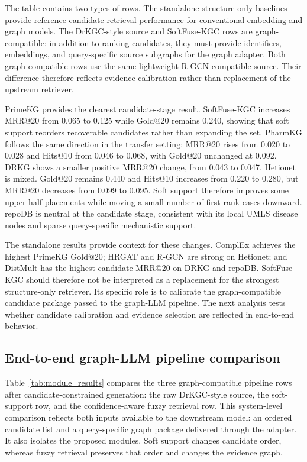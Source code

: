 \documentclass[pdflatex,sn-mathphys-num]{sn-jnl}
\newcommand{\tabref}[1]{Table~\ref{#1}}
\newcommand{\softfuse}{SoftFuse-KGC}
\newcommand{\drkgc}{DrKGC}
\begin{document}
The table contains two types of rows. The standalone structure-only baselines provide reference candidate-retrieval performance for conventional embedding and graph models. The \drkgc{}-style source and \softfuse{} rows are graph-compatible: in addition to ranking candidates, they must provide identifiers, embeddings, and query-specific source subgraphs for the graph adapter. Both graph-compatible rows use the same lightweight R-GCN-compatible source. Their difference therefore reflects evidence calibration rather than replacement of the upstream retriever.

PrimeKG provides the clearest candidate-stage result. \softfuse{} increases MRR@20 from 0.065 to 0.125 while Gold@20 remains 0.240, showing that soft support reorders recoverable candidates rather than expanding the set. PharmKG follows the same direction in the transfer setting: MRR@20 rises from 0.020 to 0.028 and Hits@10 from 0.046 to 0.068, with Gold@20 unchanged at 0.092. DRKG shows a smaller positive MRR@20 change, from 0.043 to 0.047. Hetionet is mixed. Gold@20 remains 0.440 and Hits@10 increases from 0.220 to 0.280, but MRR@20 decreases from 0.099 to 0.095. Soft support therefore improves some upper-half placements while moving a small number of first-rank cases downward. repoDB is neutral at the candidate stage, consistent with its local UMLS disease nodes and sparse query-specific mechanistic support.

The standalone results provide context for these changes. ComplEx achieves the highest PrimeKG Gold@20; HRGAT and R-GCN are strong on Hetionet; and DistMult has the highest candidate MRR@20 on DRKG and repoDB. \softfuse{} should therefore not be interpreted as a replacement for the strongest structure-only retriever. Its specific role is to calibrate the graph-compatible candidate package passed to the graph-LLM pipeline. The next analysis tests whether candidate calibration and evidence selection are reflected in end-to-end behavior.

\subsection{End-to-end graph-LLM pipeline comparison}

\tabref{tab:module_results} compares the three graph-compatible pipeline rows after candidate-constrained generation: the raw \drkgc{}-style source, the soft-support row, and the confidence-aware fuzzy retrieval row. This system-level comparison reflects both inputs available to the downstream model: an ordered candidate list and a query-specific graph package delivered through the adapter. It also isolates the proposed modules. Soft support changes candidate order, whereas fuzzy retrieval preserves that order and changes the evidence graph.
\end{document}
